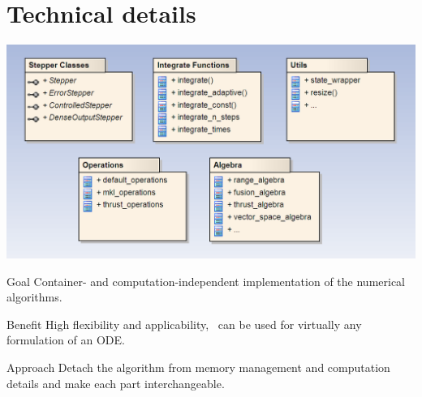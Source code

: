 \section{Technical details}


\begin{frame}
  \tableofcontents[currentsection] 
\end{frame}

\begin{frame}
 
 \vspace{2ex}
 \centerline{\includegraphics[draft=false,width=1.0\textwidth]{odeint_components.png}}

\end{frame}


\begin{frame}

\begin{block}{Goal}
 Container- and computation-independent implementation of the numerical algorithms.  
\end{block}

\begin{block}{Benefit}
 High flexibility and applicability, \odeint\ can be used for virtually any formulation of an ODE.
\end{block}
 
\begin{block}{Approach}
 Detach the algorithm from memory management and computation details and make each part interchangeable.
\end{block}

\end{frame}

